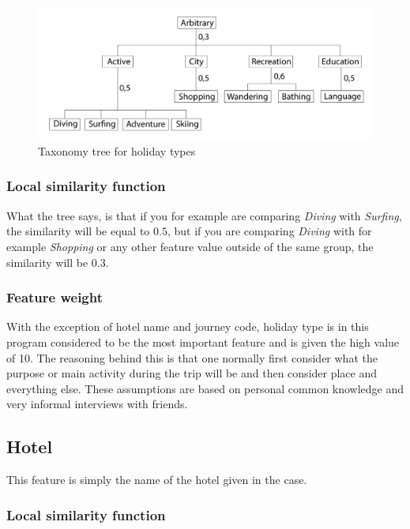\documentclass[12pt]{article}
\begin{document}
\begin{figure}[h]
\centering
\includegraphics[width=1\textwidth]{taxonomy-tree-ht.png}
\caption{\label{fig:taxonomy-tree-ht.png}Taxonomy tree for holiday types}
\end{figure}

\subsubsection{Local similarity function}

What the tree says, is that if you for example are comparing \textit{Diving} with \textit{Surfing}, the similarity will be equal to $0.5$, but if you are comparing \textit{Diving} with for example \textit{Shopping} or any other feature value outside of the same group, the similarity will be $0.3$.

\subsubsection{Feature weight}

With the exception of hotel name and journey code, holiday type is in this program considered to be the most important feature and is given the high value of 10. The reasoning behind this is that one normally first consider what the purpose or main activity during the trip will be and then consider place and everything else. These assumptions are based on personal common knowledge and very informal interviews with friends. 

\subsection{Hotel}

This feature is simply the name of the hotel given in the case. 

\subsubsection{Local similarity function}
\end{document}
